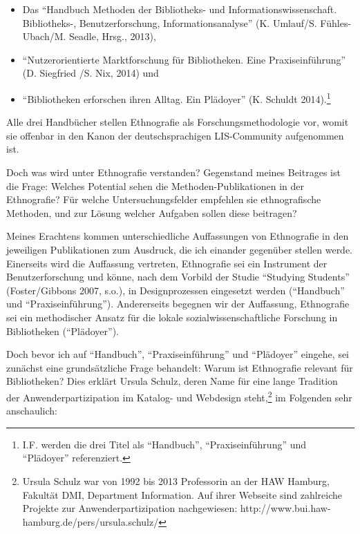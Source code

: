 \documentclass[a4paper,
fontsize=11pt,
oneside,
numbers=noperiodatend,
parskip=half-,
bibliography=totoc,
final
]{scrartcl}
\begin{document}
\begin{itemize}
\item
  Das \enquote{Handbuch Methoden der Bibliotheks- und
  Informationswissenschaft. Bibliotheks-, Benutzerforschung,
  Informationsanalyse} (K. Umlauf/S. Fühles-Ubach/M. Seadle, Hrsg.,
  2013),
\item
  \enquote{Nutzerorientierte Marktforschung für Bibliotheken. Eine
  Praxiseinführung} (D. Sieg\-fried /S. Nix, 2014) und
\item
  \enquote{Bibliotheken erforschen ihren Alltag. Ein Plädoyer} (K.
  Schuldt 2014).\footnote{I.F. werden die drei Titel als
    \enquote{Handbuch}, \enquote{Praxiseinführung} und
    \enquote{Plädoyer} referenziert.}
\end{itemize}

Alle drei Handbücher stellen Ethnografie als Forschungsmethodologie vor,
womit sie offenbar in den Kanon der deutschsprachigen LIS-Community
aufgenommen ist.

Doch was wird unter Ethnografie verstanden? Gegenstand meines Beitrages
ist die Frage: Welches Potential sehen die Methoden-Publikationen in der
Ethnografie? Für welche Untersuchungsfelder empfehlen sie ethnografische
Methoden, und zur Lösung welcher Aufgaben sollen diese beitragen?

Meines Erachtens kommen unterschiedliche Auffassungen von Ethnografie in
den jeweiligen Publikationen zum Ausdruck, die ich einander gegenüber
stellen werde. Einerseits wird die Auffassung vertreten, Ethnografie sei
ein Instrument der Benutzerforschung und könne, nach dem Vorbild der
Studie \enquote{Studying Students} (Foster/Gibbons 2007, s.o.), in
Designprozessen eingesetzt werden (\enquote{Handbuch} und
\enquote{Praxiseinführung}). Andererseits begegnen wir der Auffassung,
Ethnografie sei ein methodischer Ansatz für die lokale
sozialwissenschaftliche Forschung in Bibliotheken (\enquote{Plädoyer}).

Doch bevor ich auf \enquote{Handbuch}, \enquote{Praxiseinführung} und
\enquote{Plädoyer} eingehe, sei zunächst eine grundsätzliche Frage
behandelt: Warum ist Ethnografie relevant für Bibliotheken? Dies erklärt
Ursula Schulz, deren Name für eine lange Tradition der
Anwenderpartizipation im Katalog- und Webdesign steht,\footnote{Ursula
  Schulz war von 1992 bis 2013 Professorin an der HAW Hamburg, Fakultät
  DMI, Department Information. Auf ihrer Webseite sind zahlreiche
  Projekte zur Anwenderpartizipation nachgewiesen:
  http://www.bui.haw-hamburg.de/pers/ursula.schulz/} im Folgenden sehr
anschaulich:
\end{document}

